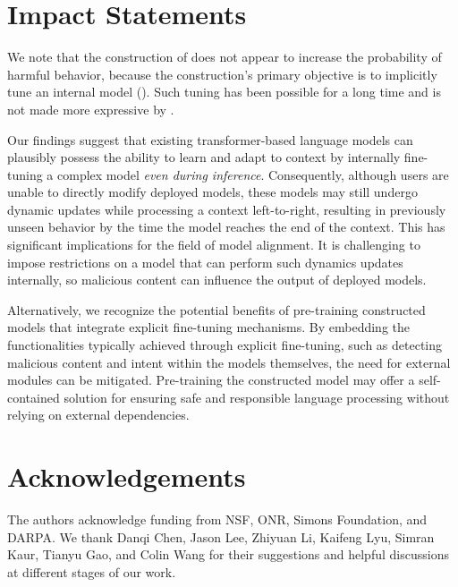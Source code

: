 \section*{Impact Statements}
We note that the construction of \simulator{} does not appear to increase the probability of harmful behavior, because the construction's primary objective is to implicitly tune an internal model (\textsection{\ref{sec:design}}).
Such tuning has been possible for a long time and is not made more expressive by \simulator{}.

Our findings suggest that existing transformer-based language models can plausibly possess the ability to learn and adapt to context by internally fine-tuning a complex model \emph{even during inference}. 
Consequently, although users are unable to directly modify deployed models, these models may still undergo dynamic updates while processing a context left-to-right, resulting in previously unseen behavior by the time the model reaches the end of the context.
This has significant implications for the field of model alignment.
It is challenging to impose restrictions on a model that can perform such dynamics updates internally, so malicious content can influence the output of deployed models.


Alternatively, we recognize the potential benefits of pre-training constructed models that integrate explicit fine-tuning mechanisms. By embedding the functionalities typically achieved through explicit fine-tuning, such as detecting malicious content and intent within the models themselves, the need for external modules can be mitigated. Pre-training the constructed model may offer a self-contained solution for ensuring safe and responsible language processing without relying on external dependencies.


\section*{Acknowledgements}
The authors acknowledge funding from NSF, ONR, Simons Foundation, and DARPA.
We thank Danqi Chen, Jason Lee, Zhiyuan Li, Kaifeng Lyu, Simran Kaur, Tianyu Gao, and Colin Wang for their suggestions and helpful discussions at different stages of our work.